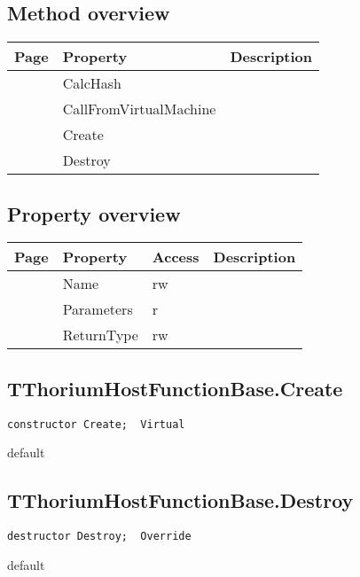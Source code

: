 \subsection{Method overview}
\label{thoriumcore:thorium:tthoriumhostfunctionbase:methods}
\begin{tabularx}{\textwidth}{llX}
Page & Property & Description  \\ \hline
\pageref{thoriumcore:thorium:tthoriumhostfunctionbase:calchash} & CalcHash  &  \\
\pageref{thoriumcore:thorium:tthoriumhostfunctionbase:callfromvirtualmachine} & CallFromVirtualMachine  &  \\
\pageref{thoriumcore:thorium:tthoriumhostfunctionbase:create} & Create  &  \\
\pageref{thoriumcore:thorium:tthoriumhostfunctionbase:destroy} & Destroy  &  \\
\hline
\end{tabularx}
\subsection{Property overview}
\label{thoriumcore:thorium:tthoriumhostfunctionbase:properties}
\begin{tabularx}{\textwidth}{lllX}
Page & Property & Access & Description \\ \hline
\pageref{thoriumcore:thorium:tthoriumhostfunctionbase:name} & Name & rw &  \\
\pageref{thoriumcore:thorium:tthoriumhostfunctionbase:parameters} & Parameters & r &  \\
\pageref{thoriumcore:thorium:tthoriumhostfunctionbase:returntype} & ReturnType & rw &  \\
\hline
\end{tabularx}
\subsection{TThoriumHostFunctionBase.Create}
\label{thoriumcore:thorium:tthoriumhostfunctionbase:create}
\begin{FPCList}
\Synopsis
\Declaration 

\begin{verbatim}
constructor Create;  Virtual
\end{verbatim}
\Visibility
default
\Description
\Errors
\end{FPCList}
\subsection{TThoriumHostFunctionBase.Destroy}
\label{thoriumcore:thorium:tthoriumhostfunctionbase:destroy}
\begin{FPCList}
\Synopsis
\Declaration 

\begin{verbatim}
destructor Destroy;  Override
\end{verbatim}
\Visibility
default
\Description
\Errors
\end{FPCList}
